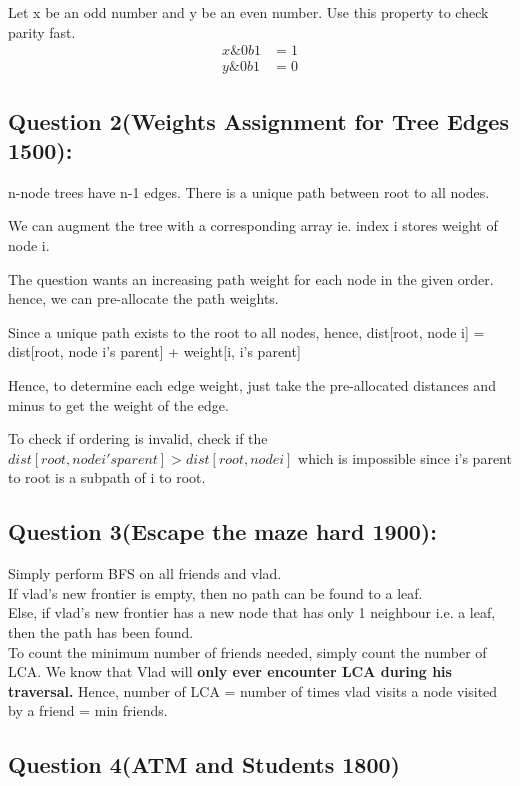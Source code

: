 \documentclass[12pt]{article}
\begin{document}
 Let x be an odd number and y be an even number.  Use this property to check parity fast. 
 \begin{align}
  x \& 0b1 & = 1 \\ 
  y \& 0b1 & = 0 
 \end{align} 
 
 \subsection{Question 2(Weights Assignment for Tree Edges 1500):} 
 
 n-node trees have n-1 edges. 
 There is a unique path between root to all nodes. 
 
 We can augment the tree with a corresponding array ie. index i stores weight of node i. 
 
 The question wants an increasing path weight for each node in the given order. 
 hence, we can pre-allocate the path weights. 
 
 Since a unique path exists to the root to all nodes, hence, 
 dist[root, node i] = dist[root, node i's parent] + weight[i, i's parent] 
 
 Hence, to determine each edge weight, just take the pre-allocated distances and minus to get the weight of the edge. 
 
 To check if ordering is invalid, check if the \(dist[root, node i's parent] > dist[root, node i]\) which is impossible since i's parent to root is a subpath of i to root. 
 
 \subsection{Question 3(Escape the maze hard 1900):}
 
 Simply perform BFS on all friends and vlad. \\
 If vlad's new frontier is empty, then no path can be found to a leaf. \\
 Else, if vlad's new frontier has a new node that has only 1 neighbour i.e. a leaf, then the path has been found. \\ 
 
 To count the minimum number of friends needed, simply count the number of LCA. 
 We know that Vlad will {\textbf{only ever encounter LCA during his traversal.}}
 Hence, number of LCA = number of times vlad visits a node visited by a friend = min friends.
 
 \subsection{Question 4(ATM and Students 1800)} 
 
\end{document}
